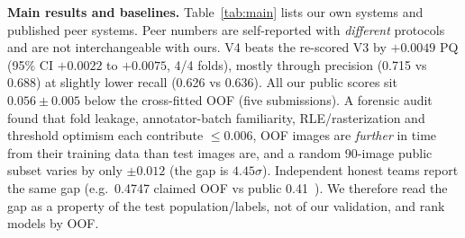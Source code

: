 \documentclass[sigconf]{acmart}
\begin{document}
\textbf{Main results and baselines.} Table~\ref{tab:main} lists our own systems and published peer systems. Peer numbers are self-reported with \emph{different} protocols and are not interchangeable with ours. V4 beats the re-scored V3 by $+0.0049$ PQ (95\% CI $+0.0022$ to $+0.0075$, 4/4 folds), mostly through precision (0.715 vs 0.688) at slightly lower recall (0.626 vs 0.636). All our public scores sit $0.056\pm0.005$ below the cross-fitted OOF (five submissions). A forensic audit found that fold leakage, annotator-batch familiarity, RLE/rasterization and threshold optimism each contribute ${\le}0.006$, OOF images are \emph{further} in time from their training data than test images are, and a random 90-image public subset varies by only $\pm0.012$ (the gap is $4.45\sigma$). Independent honest teams report the same gap (e.g.\ 0.4747 claimed OOF vs public 0.41~\cite{peer_saltytaro}). We therefore read the gap as a property of the test population/labels, not of our validation, and rank models by OOF.
\end{document}
